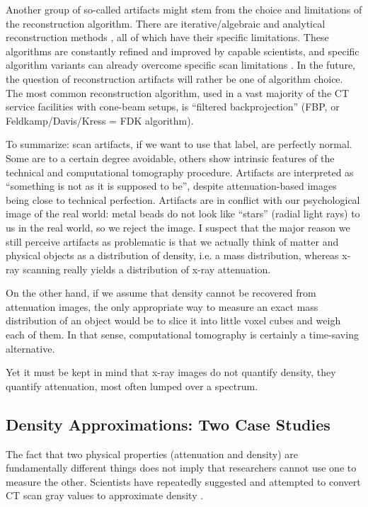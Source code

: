 Another group of so-called artifacts might stem from the choice and limitations of the reconstruction algorithm.
There are iterative/algebraic and analytical reconstruction methods \citep{Gilbert1972,Andersen1984,Feldkamp1984,Geyer2015,Hansen2021}, all of which have their specific limitations.
These algorithms are constantly refined and improved by capable scientists, and specific algorithm variants can already overcome specific scan limitations \citep[e.g.][]{Six2019,Frenkel2022}.
In the future, the question of reconstruction artifacts will rather be one of algorithm choice.
The most common reconstruction algorithm, used in a vast majority of the CT service facilities with cone-beam setups, is ``filtered backprojection'' (FBP, or Feldkamp/Davis/Kress = FDK algorithm).


To summarize: scan artifacts, if we want to use that label, are perfectly normal.
Some are to a certain degree avoidable, others show intrinsic features of the technical and computational tomography procedure.
Artifacts are interpreted as ``something is not as it is supposed to be'', despite attenuation-based images being close to technical perfection.
Artifacts are in conflict with our psychological image of the real world: metal beads do not look like ``stars'' (radial light rays) to us in the real world, so we reject the image.
I suspect that the major reason we still perceive artifacts as problematic is that we actually think of matter and physical objects as a distribution of density, i.e. a mass distribution, whereas x-ray scanning really yields a distribution of x-ray attenuation.

On the other hand, if we assume that density cannot be recovered from attenuation images, the only appropriate way to measure an exact mass distribution of an object would be to slice it into little voxel cubes and weigh each of them.
In that sense, computational tomography is certainly a time-saving alternative.


Yet it must be kept in mind that x-ray images do not quantify density, they quantify attenuation, most often lumped over a spectrum.


\subsection{Density Approximations: Two Case Studies}
\label{sec:org26977a7}
The fact that two physical properties (attenuation and density) are fundamentally different things does not imply that researchers cannot use one to measure the other.
Scientists have repeatedly suggested and attempted to convert CT scan gray values to approximate density \citep{DuPlessis2013,Durston2022}.


